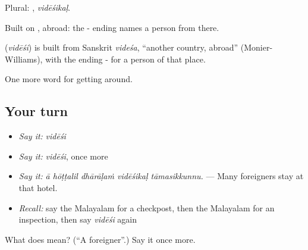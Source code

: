 Plural: , \emph{vidēśikaḷ}.

Built on , abroad: the - ending names a person from there.

\begin{cousinweb}
\textbf{} (\emph{vidēśi}) is built from Sanskrit \emph{videśa}, \textquotedblleft{}another country, abroad\textquotedblright{} (Monier-Williams), with the ending - for a person of that place.
\end{cousinweb}

\begin{grammarlens}[title={What you've built}]
One more word for getting around.
\end{grammarlens}

\subsection*{Your turn}
\begin{itemize}
\raggedright
  \item \emph{Say it:} \emph{vidēśi}
  \item \emph{Say it:} \emph{vidēśi}, once more
  \item \emph{Say it:} \emph{ā hōṭṭalil dhārāḷaṁ vidēśikaḷ tāmasikkunnu.} — Many foreigners stay at that hotel.
  \item \emph{Recall:} say the Malayalam for a checkpost, then the Malayalam for an inspection, then say \emph{vidēśi} again
\end{itemize}

\begin{tcolorbox}[breakable,colback=teal!4,colframe=teal!35!black,title={Before you move on}]
What does  mean? (\textquotedblleft{}A foreigner\textquotedblright{}.) Say it once more.
\end{tcolorbox}
